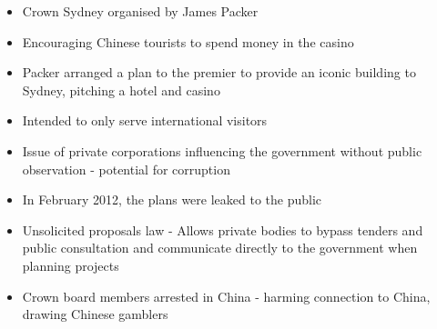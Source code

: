 		\begin{itemize}
			\item Crown Sydney organised by James Packer
			\item Encouraging Chinese tourists to spend money in the casino
			\item Packer arranged a plan to the premier to provide an iconic building to Sydney, pitching a hotel and casino
			\item Intended to only serve international visitors
			\item Issue of private corporations influencing the government without public observation - potential for corruption
			\item In February 2012, the plans were leaked to the public
			\item Unsolicited proposals law - Allows private bodies to bypass tenders and public consultation and communicate directly to the government when planning projects
			\item Crown board members arrested in China - harming connection to China, drawing Chinese gamblers
		\end{itemize}
